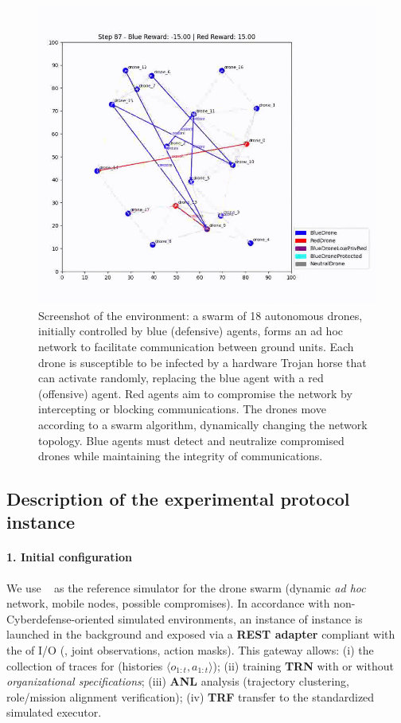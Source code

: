 \begin{figure}[h!]
  \centering
  \includegraphics[trim=0cm 1cm 0cm 1cm, clip, width=0.6\linewidth]{figures/cyborg.png}
  \caption[Screenshot of the  environment]{Screenshot of the  environment: a swarm of 18 autonomous drones, initially controlled by blue (defensive) agents, forms an ad hoc network to facilitate communication between ground units. Each drone is susceptible to be infected by a hardware Trojan horse that can activate randomly, replacing the blue agent with a red (offensive) agent. Red agents aim to compromise the network by intercepting or blocking communications. The drones move according to a swarm algorithm, dynamically changing the network topology. Blue agents must detect and neutralize compromised drones while maintaining the integrity of communications.}
  \label{fig:cyborg}
\end{figure}

\subsection{Description of the experimental protocol instance}

\paragraph{1. Initial configuration}

We use \textbf{}~\cite{Standen2021} as the reference simulator for the drone swarm (dynamic \textit{ad hoc} network, mobile nodes, possible compromises). In accordance with non-Cyberdefense-oriented simulated environments, an instance of  instance is launched in the background and exposed via a \textbf{REST adapter} compliant with the  of  I/O (, joint observations, action masks). This gateway allows: (i) the collection of traces for  (histories $\langle o_{1:t}, a_{1:t} \rangle$); (ii) training  \textbf{TRN} with or without \textit{organizational specifications}; (iii) \textbf{ANL} analysis (trajectory clustering, role/mission alignment verification); (iv) \textbf{TRF} transfer to the standardized simulated executor.

